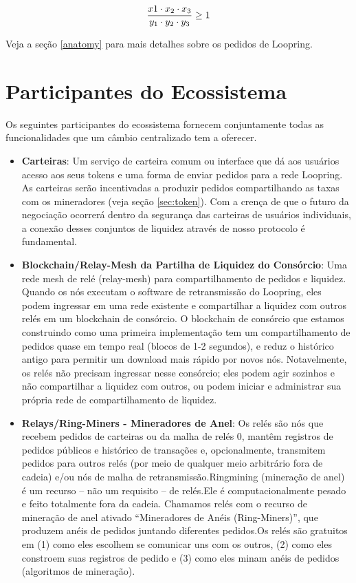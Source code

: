 \documentclass[UTF8,nofonts]{article}
\begin{document}
\begin{multicols}{2}
\begin{equation}
{{x1 \cdot x_2 \cdot x_3 \over y_1 \cdot y_2 \cdot y_3} \geq 1}
\end{equation}


Veja a seção \ref{anatomy} para mais detalhes sobre os pedidos de Loopring.



\section{Participantes do Ecossistema\label{sec:ecosystem}}
Os seguintes participantes do ecossistema fornecem conjuntamente todas as funcionalidades que um câmbio centralizado tem a oferecer. 

\begin{itemize}

\item \textbf{Carteiras}: Um serviço de carteira comum ou interface que dá aos usuários acesso aos seus tokens e uma forma de enviar pedidos para a rede Loopring. As carteiras serão incentivadas a produzir pedidos compartilhando as taxas com os mineradores (veja seção \ref{sec:token}). Com a crença de que o futuro da negociação ocorrerá dentro da segurança das carteiras de usuários individuais, a conexão desses conjuntos de liquidez através de nosso protocolo é fundamental.

\item \textbf{Blockchain/Relay-Mesh da Partilha de Liquidez do Consórcio}: Uma rede mesh de relé (relay-mesh) para compartilhamento de pedidos e liquidez. Quando os nós executam o software de retransmissão do Loopring, eles podem ingressar em uma rede existente e compartilhar a liquidez com outros relés em um blockchain de consórcio. O blockchain de consórcio que estamos construindo como uma primeira implementação tem um compartilhamento de pedidos quase em tempo real  (blocos de 1-2 segundos), e reduz o histórico antigo para permitir um download mais rápido por novos nós. Notavelmente, os relés não precisam ingressar nesse consórcio; eles podem agir sozinhos e não compartilhar a liquidez com outros, ou podem iniciar e administrar sua própria rede de compartilhamento de liquidez.


\item \textbf{Relays/Ring-Miners - Mineradores de Anel}: 
Os relés são nós que recebem pedidos de carteiras ou da malha de relés 0,  mantêm registros de pedidos públicos e histórico de transações e, opcionalmente, transmitem pedidos para outros relés (por meio de qualquer meio arbitrário fora de cadeia) e/ou nós de malha de retransmissão.Ringmining (mineração de anel) é um recurso -- não um requisito -- de relés.Ele é computacionalmente pesado e feito totalmente fora da cadeia. Chamamos relés com o recurso de mineração de anel ativado “Mineradores de Anéis (Ring-Miners)”, que produzem anéis de pedidos juntando diferentes pedidos.Os relés são gratuitos em (1) como eles escolhem se comunicar uns com os outros, (2) como eles constroem suas registros de pedido e (3) como eles minam anéis de pedidos (algoritmos de mineração).


\end{itemize}
\end{multicols}
\end{document}
